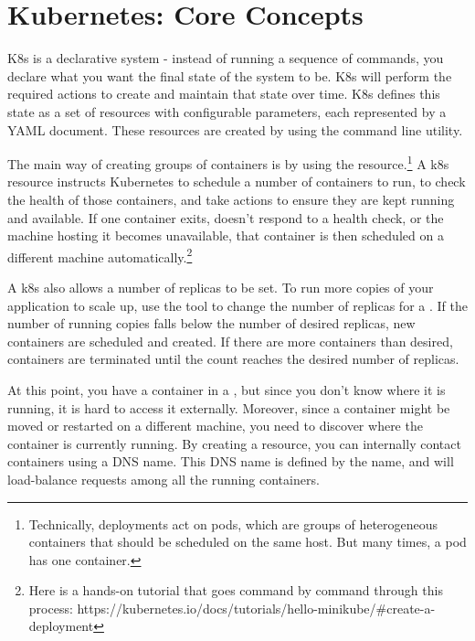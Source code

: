 \documentclass[11pt,twoside]{article}
\begin{document}
\section{Kubernetes: Core Concepts}

K8s is a declarative system - instead of running
a sequence of commands, you declare what you want the final state of the system to be.
K8s will perform the required actions to create and maintain that state over time.
K8s defines this state as a set of resources with configurable parameters, each represented by a YAML document.
These resources are created by using the  command line utility.

The main way of creating groups of containers is by using the  resource.\footnote{
Technically, deployments act on pods, which are groups of heterogeneous containers that should be
scheduled on the same host.  But many times, a pod has one container.}
A k8s  resource instructs Kubernetes to schedule a number of containers to run,
to check the health of those containers,
and take actions to ensure they are kept running and available.  If one container exits, doesn't respond
to a health check, or the machine hosting it becomes unavailable, that container is then scheduled
on a different machine automatically.\footnote{
Here is a hands-on tutorial that goes command by command through this process:
https://kubernetes.io/docs/tutorials/hello-minikube/\#create-a-deployment}

A k8s  also allows a number of replicas to be set.  To run more copies of your application to
scale up, use the  tool to change the number of replicas for
a .  If the number of running copies falls below the number of desired replicas, new
containers are scheduled and created.  If there are more containers than desired, containers are terminated
until the count reaches the desired number of replicas.

At this point, you have a container in a , but since you don't know
where it is running, it is hard to access it externally.
Moreover, since a container might be moved or restarted on a different machine, you need to discover
where the container is currently running.  By creating
a  resource, you can internally contact containers using a DNS name.
This DNS name is defined by the  name, and will load-balance
requests among all the running containers.
\end{document}
